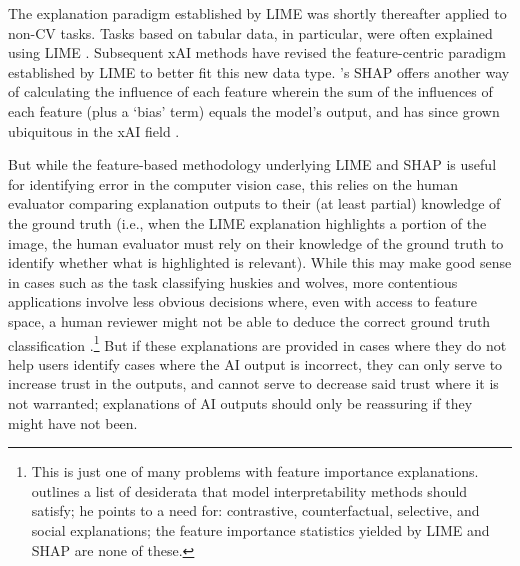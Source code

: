 The explanation paradigm established by LIME was shortly thereafter applied to non-CV tasks. Tasks based on tabular data, in particular, were often explained using LIME \cite{zerilli_explaining_2020}. Subsequent xAI methods have revised the feature-centric paradigm established by LIME to better fit this new data type. \textcite{lundberg_unified_2017}'s SHAP offers another way of calculating the influence of each feature wherein the sum of the influences of each feature (plus a `bias' term) equals the model's output, and has since grown ubiquitous in the xAI field \cite{weerts_human-grounded_2019}.

But while the feature-based methodology underlying LIME and SHAP is useful for identifying error in the computer vision case, this relies on the human evaluator comparing explanation outputs to their (at least partial) knowledge of the ground truth (i.e., when the LIME explanation highlights a portion of the image, the human evaluator must rely on their knowledge of the ground truth to identify whether what is highlighted is relevant). While this may make good sense in cases such as the task classifying huskies and wolves, more contentious applications involve less obvious decisions where, even with access to feature space, a human reviewer might not be able to deduce the correct ground truth classification \cite{kumar_problems_2020,markus_role_2021}.\footnote{This is just one of many problems with feature importance explanations. \textcite{miller_explanation_2017} outlines a list of desiderata that model interpretability methods should satisfy; he points to a need for: contrastive, counterfactual, selective, and social explanations; the feature importance statistics yielded by LIME and SHAP are none of these.} But if these explanations are provided in cases where they do not help users identify cases where the AI output is incorrect, they can only serve to increase trust in the outputs, and cannot serve to decrease said trust where it is not warranted; explanations of AI outputs should only be reassuring if they might have not been.

